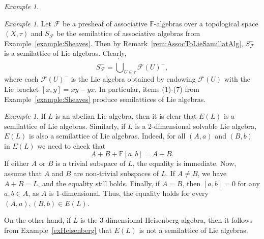 \documentclass{amsart}
\newcommand{\C}{\mathbb{C}}
\newcommand{\0}{{\vartheta}}
\theoremstyle{definition}
\theoremstyle{remark}
\newtheorem{ex}[thm]{Example}
\numberwithin{equation}{section}
\newtheorem*{Theorem A}{\textbf{Theorem A}}
\newtheorem*{Corollary E}{\textbf{Corollary E}}
\newtheorem*{Corollary F}{\textbf{Corollary F}}
\newtheorem*{Theorem B}{\textbf{Theorem B}}
\newtheorem*{Theorem C}{\textbf{Theorem C}}
\newtheorem*{Theorem D}{\textbf{Theorem B}}
\newtheorem*{p a}{\textbf{Proof of  Theorem A}}
\newtheorem*{p b}{\textbf{Proof of Theorem B}}
\newtheorem*{p c}{\textbf{Proof of  Theorem C}}
\newtheorem*{p d}{\textbf{Proof of  Theorem D}}
\begin{document}
\begin{ex}
\begin{enumerate}
\end{enumerate}

\end{ex}

\begin{ex}\label{example:SheavesLie}
 Let $\mathcal F$ be a presheaf of associative $\mathbb{F}$-algebras over a topological space $(X, \tau)$ and
 $S_{\mathcal F}$ be the semilattice of associative algebras from  Example~\ref{example:Sheaves}.  Then  by Remark~\ref{rem:AssocToLieSamillatAlg}, $S_{\mathcal F}^{-}$ is  a semilattice of Lie algebras. Clearly,
$$S_{\mathcal F}^- =    \dot{\bigcup}  _{U \in \tau} \mathcal F (U)^-, $$ where each ${\mathcal F} (U)^-$ is the Lie algebra obtained by endowing ${\mathcal F} (U)$ with the Lie bracket
$[x,y]= xy - yx.$ In particular, items (1)-(7) from Example~\ref{example:Sheaves} produce semilattices of Lie algebras.
\end{ex}

\begin{ex}
If $L$ is an abelian Lie algebra, then it is clear that $E(L)$ is a semilattice of Lie algebras. Similarly, if $L$ is a 2-dimensional solvable Lie algebra, $E(L)$ is also a semilattice of Lie algebras.  Indeed,  for all $(A,a)$ and $(B,b)$ in $E(L)$ we need to check that
$$A+B+\mathbb{F}[a,b]=A+B.$$
If either $A$ or $B$ is a trivial subspace of $L$, the equality is immediate. Now, assume that $A$ and $B$ are non-trivial subspaces of $L$. If $A\neq B$, we have $A+B=L$, and the equality still holds. Finally, if $A=B$, then $[a,b]=0$ for any $a,b\in A$, as $A$ is 1-dimensional. Thus, the equality holds for every $(A,a),(B,b)\in E(L)$.

On the other hand, if $L$ is the 3-dimensional Heisenberg algebra, then it follows from Example~\ref{exHeisenberg} that $E(L)$ is not a semilattice of Lie algebras. 
\end{ex}
\end{document}
